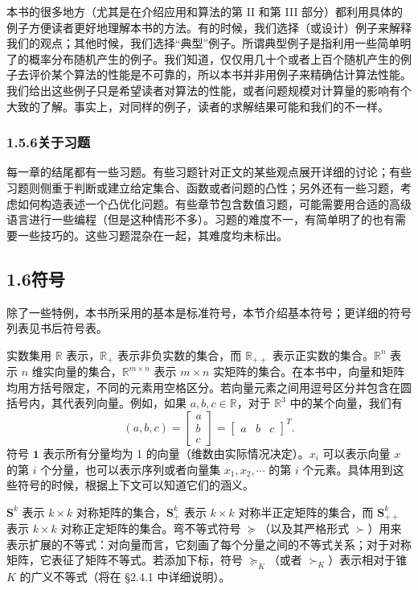 \documentclass[UTF8, 12pt, fontset=fandol, oneside]{ctexart}
\begin{document}
本书的很多地方（尤其是在介绍应用和算法的第 II 和第 III 部分）都利用具体的例子方便读者更好地理解本书的方法。有的时候，我们选择（或设计）例子来解释我们的观点；其他时候，我们选择“典型”例子。所谓典型例子是指利用一些简单明了的概率分布随机产生的例子。我们知道，仅仅用几十个或者上百个随机产生的例子去评价某个算法的性能是不可靠的，所以本书并非用例子来精确估计算法性能。我们给出这些例子只是希望读者对算法的性能，或者问题规模对计算量的影响有个大致的了解。事实上，对同样的例子，读者的求解结果可能和我们的不一样。

\subsubsection*{1.5.6\quad 关于习题}

每一章的结尾都有一些习题。有些习题针对正文的某些观点展开详细的讨论；有些习题则侧重于判断或建立给定集合、函数或者问题的凸性；另外还有一些习题，考虑如何构造表述一个凸优化问题。有些章节包含数值习题，可能需要用合适的高级语言进行一些编程（但是这种情形不多）。习题的难度不一，有简单明了的也有需要一些技巧的。这些习题混杂在一起，其难度均未标出。

\subsection*{1.6\quad 符号}

除了一些特例，本书所采用的基本是标准符号，本节介绍基本符号；更详细的符号列表见书后符号表。

实数集用 $\mathbb{R}$ 表示，$\mathbb{R}_+$ 表示非负实数的集合，而 $\mathbb{R}_{++}$ 表示正实数的集合。$\mathbb{R}^n$ 表示 $n$ 维实向量的集合，$\mathbb{R}^{m\times n}$ 表示 $m\times n$ 实矩阵的集合。在本书中，向量和矩阵均用方括号限定，不同的元素用空格区分。若向量元素之间用逗号区分并包含在圆括号内，其代表列向量。例如，如果 $a,b,c\in\mathbb{R}$，对于 $\mathbb{R}^3$ 中的某个向量，我们有
\[
  (a,b,c)=
  \begin{bmatrix}
  a\\
  b\\
  c
  \end{bmatrix}
  =
  \begin{bmatrix}
  a & b & c
  \end{bmatrix}^T.
\]
符号 $\mathbf{1}$ 表示所有分量均为 1 的向量（维数由实际情况决定）。$x_i$ 可以表示向量 $x$ 的第 $i$ 个分量，也可以表示序列或者向量集 $x_1,x_2,\cdots$ 的第 $i$ 个元素。具体用到这些符号的时候，根据上下文可以知道它们的涵义。

$\mathbf{S}^k$ 表示 $k\times k$ 对称矩阵的集合，$\mathbf{S}_+^k$ 表示 $k\times k$ 对称半正定矩阵的集合，而 $\mathbf{S}_{++}^k$ 表示 $k\times k$ 对称正定矩阵的集合。弯不等式符号 $\succeq$（以及其严格形式 $\succ$）用来表示扩展的不等式：对向量而言，它刻画了每个分量之间的不等式关系；对于对称矩阵，它表征了矩阵不等式。若添加下标，符号 $\succeq_K$（或者 $\succ_K$）表示相对于锥 $K$ 的广义不等式（将在 §2.4.1 中详细说明）。
\end{document}
